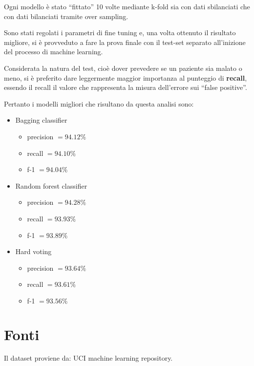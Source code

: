 \documentclass[a4paper]{article}
\begin{document}
    Ogni modello è stato ``fittato'' 10 volte mediante k-fold sia con dati sbilanciati che con dati bilanciati tramite 
    over sampling.
    
    Sono stati regolati i parametri di fine tuning e, una volta ottenuto il risultato migliore,
    si è provveduto a fare la prova finale con il test-set separato all'inizione del processo
    di machine learning.

    Considerata la natura del test, cioè dover prevedere se un paziente sia malato o meno, si è preferito dare
    leggermente maggior importanza al punteggio di \textbf{recall}, essendo il recall il valore che rappresenta
    la misura dell'errore sui ``false positive''.
    
    Pertanto i modelli migliori che risultano da questa analisi sono:
    \begin{itemize}
        \item Bagging classifier
        \begin{itemize}
            \item precision $= 94.12\%$
            \item recall $= 94.10\%$
            \item f-1 $= 94.04\%$
        \end{itemize}
        \item Random forest classifier
        \begin{itemize}
            \item precision $= 94.28\%$
            \item recall $= 93.93\%$
            \item f-1 $= 93.89\%$
        \end{itemize}
        \item Hard voting
        \begin{itemize}
            \item precision $= 93.64\%$
            \item recall $= 93.61\%$
            \item f-1 $= 93.56\%$
        \end{itemize}
    \end{itemize}

    \section{Fonti}
    Il dataset proviene da: UCI machine learning repository.
\end{document}
